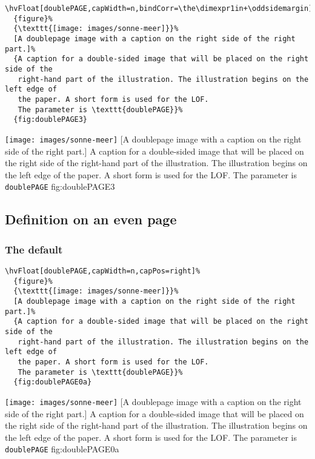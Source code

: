 \documentclass[twoside]{scrartcl}
\makeatletter
\let\hvBlindtext\Blindtext
\def\Blindtext{\par\color{black!40}\hvBlindtext\par\normalcolor}
\def\hvblindtext{\textcolor{black!40}{\blindtext@text}}
\makeatother
\begin{document}
\begin{lstlisting}
\hvFloat[doublePAGE,capWidth=n,bindCorr=\the\dimexpr1in+\oddsidemargin]%
  {figure}%
  {\texttt{[image: images/sonne-meer]}}%
  [A doublepage image with a caption on the right side of the right part.]%
  {A caption for a double-sided image that will be placed on the right side of the
   right-hand part of the illustration. The illustration begins on the left edge of 
   the paper. A short form is used for the LOF. 
   The parameter is \texttt{doublePAGE}}%
  {fig:doublePAGE3}
\end{lstlisting}

%
  {\texttt{[image: images/sonne-meer]}}%
  [A doublepage image with a caption on the right side of the right part.]%
  {A caption for a double-sided image that will be placed on the right side of the
   right-hand part of the illustration. The illustration begins on the left edge of 
   the paper. A short form is used for the LOF. 
   The parameter is \texttt{doublePAGE}}%
  {fig:doublePAGE3}


\hvblindtext


\subsection{Definition on an even page}


\subsubsection{The default}

\begin{lstlisting}
\hvFloat[doublePAGE,capWidth=n,capPos=right]%
  {figure}%
  {\texttt{[image: images/sonne-meer]}}%
  [A doublepage image with a caption on the right side of the right part.]%
  {A caption for a double-sided image that will be placed on the right side of the
   right-hand part of the illustration. The illustration begins on the left edge of 
   the paper. A short form is used for the LOF. 
   The parameter is \texttt{doublePAGE}}%
  {fig:doublePAGE0a}
\end{lstlisting}


%
  {\texttt{[image: images/sonne-meer]}}%
  [A doublepage image with a caption on the right side of the right part.]%
  {A caption for a double-sided image that will be placed on the right side of the
   right-hand part of the illustration. The illustration begins on the left edge of 
   the paper. A short form is used for the LOF. 
   The parameter is \texttt{doublePAGE}}%
  {fig:doublePAGE0a}
\end{document}
